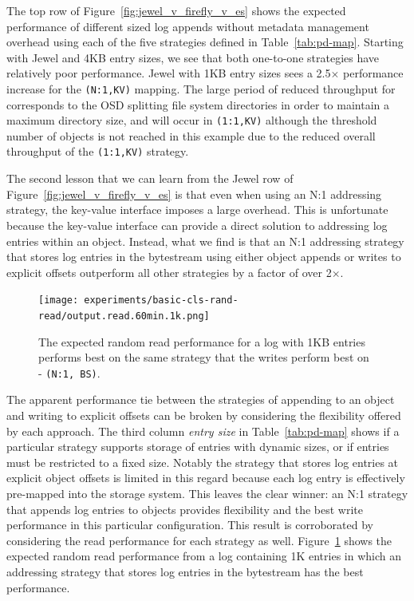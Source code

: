 \documentclass[10pt,twocolumn]{article}
\begin{document}
The top row of Figure~\ref{fig:jewel_v_firefly_v_es} shows the expected
performance of different sized log appends without metadata management overhead
using each of the five strategies defined in Table~\ref{tab:pd-map}.  Starting
with Jewel and 4KB entry sizes, we see that both one-to-one strategies have
relatively poor performance. Jewel with 1KB entry sizes sees a 2.5\(\times\)
performance increase for the \texttt{(N:1,KV)} mapping. The large period of reduced
throughput for corresponds to the OSD splitting file system directories in
order to maintain a maximum directory size, and will occur in \texttt{(1:1,KV)}
although the threshold number of objects is not reached in this example due to
the reduced overall throughput of the \texttt{(1:1,KV)} strategy.

The second lesson that we can learn from the Jewel row of
Figure~\ref{fig:jewel_v_firefly_v_es} is that even when using an N:1 addressing
strategy, the key-value interface imposes a large overhead. This is unfortunate
because the key-value interface can provide a direct solution to addressing log
entries within an object.  Instead, what we find is that an N:1 addressing
strategy that stores log entries in the bytestream using either object appends
or writes to explicit offsets outperform all other strategies by a factor of
over 2\(\times\).

\begin{figure}[t]
      \centering
      \texttt{[image: experiments/basic-cls-rand-read/output.read.60min.1k.png]}
      \caption{The expected random read performance for a log with 1KB entries
      performs best on the same strategy that the writes perform
      best on - \texttt{(N:1, BS)}.}
      \label{fig:vanilla_rd_jewel}
\end{figure}

The apparent performance tie between the strategies of appending to an object
and writing to explicit offsets can be broken by considering the flexibility
offered by each approach. The third column \emph{entry size} in
Table~\ref{tab:pd-map} shows if a particular strategy supports storage of
entries with dynamic sizes, or if entries must be restricted to a fixed size.
Notably the strategy that stores log entries at explicit object offsets is
limited in this regard because each log entry is effectively pre-mapped into
the storage system. This leaves the clear winner: an N:1 strategy that appends
log entries to objects provides flexibility and the best write performance in
this particular configuration.  This result is corroborated by considering the
read performance for each strategy as well. Figure~\ref{fig:vanilla_rd_jewel}
shows the expected random read performance from a log containing 1K entries in
which an addressing strategy that stores log entries in the bytestream has the
best performance.
\end{document}
